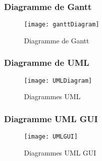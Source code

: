 \documentclass[12pt]{beamer}
\begin{document}
\begin{frame}
  \frametitle{Diagramme de Gantt}
  \begin{figure}[t]
    \centering
    \texttt{[image: ganttDiagram]}
    \caption{Diagramme de Gantt}
  \end{figure}
\end{frame}


\begin{frame}
  \frametitle{Diagramme de UML}
  \begin{figure}[t]
    \centering
    \texttt{[image: UMLDiagram]}
    \caption{Diagrammes UML}
  \end{figure}
\end{frame}

\begin{frame}
  \frametitle{Diagramme UML GUI}
  \begin{figure}[t]
    \centering
    \texttt{[image: UMLGUI]}
    \caption{Diagrammes UML GUI}
  \end{figure}
\end{frame}
\end{document}
